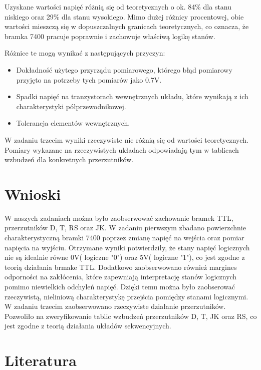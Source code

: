 \documentclass{article}
\begin{document}
Uzyskane wartości napięć różnią się od teoretycznych o ok. 84\% dla stanu niskiego oraz 29\% dla stanu wysokiego.
Mimo dużej różnicy procentowej, obie wartości mieszczą się w dopuszczalnych granicach teoretycznych, co oznacza, że bramka 7400 pracuje poprawnie i zachowuje właściwą logikę stanów.\linebreak

Różnice te mogą wynikać z następujących przyczyn:

\begin{itemize}
	\item Dokładność użytego przyrządu pomiarowego, którego błąd pomiarowy przyjęto na potrzeby tych pomiarów jako 0.7V.
	\item Spadki napięć na tranzystorach wewnętrznych układu, które wynikają z ich charakterystyki półprzewodnikowej.
	\item Tolerancja elementów wewnętrznych.
\end{itemize}

W zadaniu trzecim wyniki rzeczywiste nie różnią się od wartości teoretycznych. Pomiary wykazane na rzeczywistych układach odpowiadają tym w tablicach wzbudzeń dla konkretnych przerzutników.

\pagebreak
\section{Wnioski}
W naszych zadaniach można było zaobserwować zachowanie bramek TTL, przerzutników D, T, RS oraz JK. W zadaniu pierwszym zbadano powierzchnie charakterystyczną bramki 7400 poprzez zmianę napięć na wejścia oraz pomiar napięcia na wyjściu. Otrzymane wyniki potwierdziły, że stany napięć logicznych nie są idealnie równe 0V( logiczne "0") oraz 5V( logiczne "1"), co jest zgodne z teorią działania brmake TTL. Dodatkowo zaobserwowano również margines odporności na zakłócenia, które zapewniają interpretację stanów logicznych pomimo niewielkich odchyleń napięć. Dzięki temu można było zaobserować rzeczywistą, nieliniową charakterystykę przejścia pomiędzy stanami logicznymi.\\

W zadaniu trzecim zaobserwowano rzeczywiste działanie przerzutników. Pozwoliło na zweryfikowanie tablic wzbudzeń przerzutników D, T, JK oraz RS, co jest zgodne z teorią działania układów sekwencyjnych.
\section{Literatura}
\end{document}
